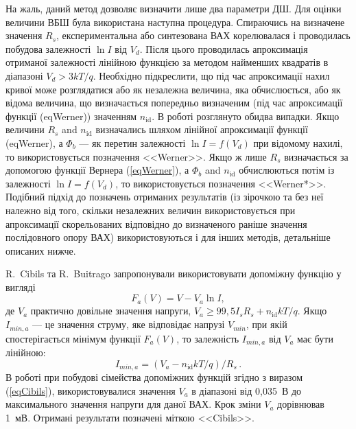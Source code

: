 На жаль, даний метод дозволяє визначити лише два параметри ДШ.
Для оцінки величини ВБШ була використана наступна процедура.
Спираючись на визначене значення $R_s$, експериментальна або синтезована ВАХ корелювалася і проводилась побудова залежності  $\ln I$ від $V_d$.
Після цього проводилась апроксимація отриманої залежності лінійною функцією за методом найменших квадратів \cite[с.~67]{KalitkinBook} в діапазоні $V_d>3kT/q$.
Необхідно підкреслити, що під час апроксимації нахил кривої може розглядатися або як незалежна величина, яка обчислюється, або як відома величина, що визначається попередньо визначеним (під час апроксимації функції (eqWerner)) значенням $n_\mathrm{id}$.
В роботі розглянуто обидва випадки.
Якщо величини $R_s$ and $n_\mathrm{id}$ визначались шляхом лінійної апроксимації функції (eqWerner), а $\Phi_b$ --- як перетин залежності $\ln I=f(V_d)$ при відомому нахилі, то використовується позначення <<Werner>>.
Якщо ж лише $R_s$ визначається за допомогою функції Вернера (\ref{eqWerner}), а $\Phi_b$ and $n_\mathrm{id}$ обчислюються потім із залежності $\ln I=f(V_d)$, то використовується позначення <<Werner*>>.
Подібний підхід до позначень отриманих результатів (із зірочкою та без неї належно від того, скільки незалежних величин використовується при апроксимації скорельованих відповідно до визначеного раніше значення послідовного опору ВАХ) використовуються і для інших методів, детальніше описаних нижче.

R.~Cibils  та R.~Buitrago \cite{Cibils} запропонували використовувати допоміжну функцію у вигляді
\begin{equation}
\label{eqCibils}
F_a(V)=V-V_a\ln I,
\end{equation}
де
$V_a$ практично довільне значення напруги, $V_a\geq99,5I_sR_s+n_\mathrm{id}kT/q$.
Якщо $I_{min,a}$ --- це значення струму, яке відповідає напрузі $V_{min}$, при якій спостерігається мінімум функції $F_a(V)$,
то залежність $I_{min,a}$ від $V_a$ має бути \cite{Cibils} лінійною:
\begin{equation}
\label{eqCibilsDet}
I_{min,a}=(V_a-n_\mathrm{id}kT/q)/R_s\,.
\end{equation}
В роботі при побудові сімейства допоміжних функцій згідно з виразом (\ref{eqCibils}), використовувалися значення  $V_a$ в діапазоні від 0,035~В до максимального значення напруги для даної ВАХ.
Крок зміни $V_a$ дорівнював 1~мВ.
Отримані результати позначені міткою <<Cibils>>.

